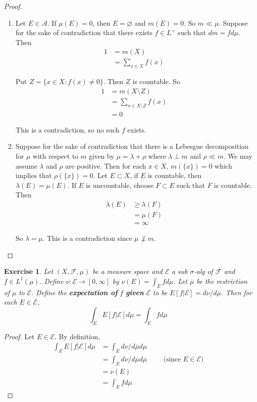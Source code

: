 \documentclass[12pt]{amsart}
\newtheorem{ex}[thm]{Exercise}
\newcommand{\lam}{\lambda}
\newcommand{\sig}{\sigma}
\newcommand{\MA}{\mathcal{A}}
\newcommand{\MF}{\mathcal{F}}
\newcommand{\ME}{\mathcal{E}}
\begin{document}
\begin{proof}
\begin{enumerate}
\item Let $E \in \MA$. If $\mu(E) = 0$, then $E = \varnothing$ and $m(E) = 0$. So $m \ll \mu$. Suppose for the sake of contradiction that there exists $f \in L^+$ such that $dm = f d\mu$. Then 
\begin{align*}
1
&= m(X) \\
&= \sum_{x \in X} f(x)
\end{align*}

Put $Z = \{x \in X: f(x) \neq 0 \}$. Then $Z$ is countable. So 
\begin{align*}
1
&= m(X \setminus Z) \\
&= \sum_{x \in X \setminus Z} f(x)\\
&= 0
\end{align*}

This is a contradiction, so no such $f$ exists.

\item Suppose for the sake of contradiction that there is a Lebesgue decomposition for $\mu$ with respect to $m$ given by $\mu = \lam + \rho$ where $\lam \perp m$ and $\rho \ll m$. We may assume $\lam$ and $\rho$ are positive. Then for each $x \in X$, $m(\{x\})=0$ which implies that $\rho(\{x\}) = 0$. Let $E \subset X$, if $E$ is countable, then $\lam(E) = \mu(E)$. If $E$ is uncountable, choose $F \subset E$ such that $F$ is countable. Then 
\begin{align*}
\lam(E) 
& \geq \lam(F) \\
& = \mu(F) \\
&= \infty
\end{align*}

So $\lam = \mu$. This is a contradiction since $\mu \not \perp m$.
\end{enumerate}
\end{proof}

\begin{ex}
Let $(X, \MF, \mu)$ be a measure space and $\ME$ a sub $\sig$-alg of $\MF$ and $f \in L^1(\mu)$. Define $\nu: \ME \rightarrow [0,\infty]$ by $\nu(E) = \int_E f d \mu $. Let $\overline{\mu}$ be the restriction of $\mu$ to $\ME$. Define the \textbf{expectation of} $f$ \textbf{given} $\ME$ to be $E[f|\ME] = d\nu / d \overline{\mu}$. Then for each $E \in \ME$, $$\int_E E[f|\ME] d\mu = \int_E f d\mu$$
\end{ex}

\begin{proof}
Let $E \in \ME$. By definition, 
\begin{align*}
\int_E E[f|\ME] d\mu 
&= \int_E d\nu / d \overline{\mu} d\mu \\
&= \int_E d\nu / d \overline{\mu} d \overline{\mu} \hspace{1cm} \text{(since $E \in \ME$)} \\
&= \nu(E)\\
&= \int_E f d \mu
\end{align*}
\end{proof}
\end{document}
